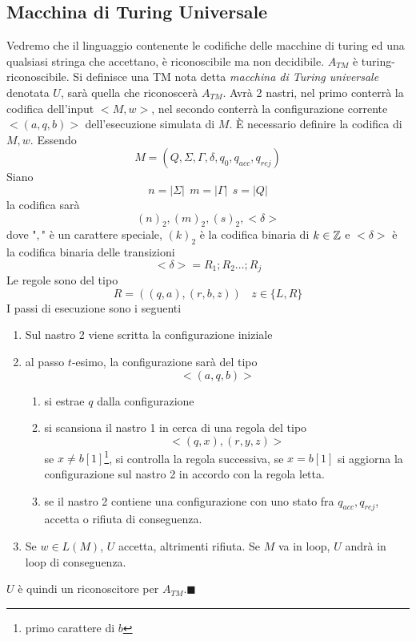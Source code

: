 \documentclass[10pt, letterpaper]{report}
\begin{document}
\subsection{Macchina di Turing Universale}
Vedremo che il linguaggio contenente le codifiche delle macchine di turing ed una qualsiasi stringa che accettano, è riconoscibile ma non decidibile.
\teo{} $A_{TM}$ è turing-riconoscibile.\acc 
\dimo{} Si definisce una TM nota detta \textit{macchina di Turing universale} denotata $U$, sarà quella che riconoscerà $A_{TM}$. Avrà 2 nastri, nel primo conterrà la codifica dell'input $<M,w>$, nel secondo conterrà la configurazione corrente $<(a,q,b)>$ dell'esecuzione simulata di $M$.\acc 
È necessario definire la codifica di $M,w$. Essendo 
$$ M=(Q,\Sigma,\Gamma,\delta,q_0,q_{acc},q_{rej})$$
Siano 
$$ n=|\Sigma| \ \ m=|\Gamma| \ \ s=|Q|$$
la codifica sarà 
$$ (n)_2,(m)_2,(s)_2,<\delta>$$
dove "$,$" è un carattere speciale, $(k)_2$ è la codifica binaria di $k\in{\mathbb Z}$ e $<\delta>$ è la codifica binaria delle transizioni 
$$ <\delta>=R_1;R_2\dots;R_j$$
Le regole sono del tipo 
$$ R=((q,a),(r,b,z)) \ \ \ \ z\in\{L,R\}$$
I passi di esecuzione sono i seguenti\begin{enumerate}
    \item Sul nastro 2 viene scritta la configurazione iniziale 
    \item al passo $t$-esimo, la configurazione sarà del tipo $$ <(a,q,b)>$$\begin{enumerate}
        \item si estrae $q$ dalla configurazione 
        \item si scansiona il nastro 1 in cerca di una regola del tipo $$ <(q,x),(r,y,z)>$$
        se $x\ne b[1]$\footnote{primo carattere di $b$}, si controlla la regola successiva, se $x=b[1]$
        si aggiorna la configurazione sul nastro 2 in accordo con la regola letta. 
        \item se il nastro 2 contiene una configurazione con uno stato fra $q_{acc},q_{rej}$, accetta o rifiuta di conseguenza. 
    \end{enumerate}
    \item Se $w\in L(M)$, $U$ accetta, altrimenti rifiuta. Se $M$ va in loop, $U$ andrà in loop di conseguenza. 
\end{enumerate}
$U$ è quindi un riconoscitore per $A_{TM}$.\hfill$\blacksquare$
\end{document}
